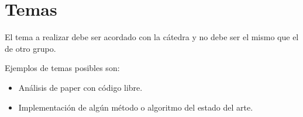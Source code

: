 \documentclass[tp]{lcc}
\begin{document}
	\maketitle
	
	
	\section{Temas}
    El tema a realizar debe ser acordado con la cátedra y no debe ser el mismo que el de otro grupo. 
	
	Ejemplos de temas posibles son:    
	\begin{itemize}
		\item Análisis de paper con código libre.
		\item Implementación de algún método o algoritmo del estado del arte.
	\end{itemize}
		
\end{document}
